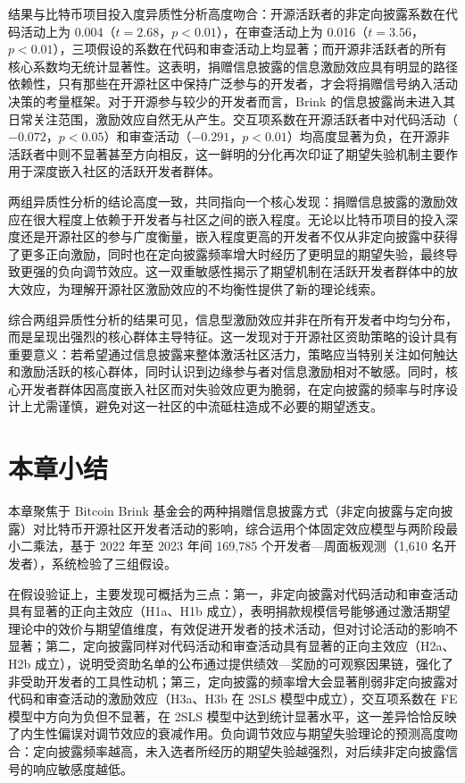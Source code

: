 \documentclass[
    type = master, %
    degree = professional,        %
    decl-page,  %
    twoside,                %
    fontset = fandol %
  ]{njuthesis}
\begin{document}
结果与比特币项目投入度异质性分析高度吻合：开源活跃者的非定向披露系数在代码活动上为 0.004（$t = 2.68$，$p < 0.01$），在审查活动上为 0.016（$t = 3.56$，$p < 0.01$），三项假设的系数在代码和审查活动上均显著；而开源非活跃者的所有核心系数均无统计显著性。这表明，捐赠信息披露的信息激励效应具有明显的路径依赖性，只有那些在开源社区中保持广泛参与的开发者，才会将捐赠信号纳入活动决策的考量框架。对于开源参与较少的开发者而言，Brink 的信息披露尚未进入其日常关注范围，激励效应自然无从产生。交互项系数在开源活跃者中对代码活动（$-0.072$，$p < 0.05$）和审查活动（$-0.291$，$p < 0.01$）均高度显著为负，在开源非活跃者中则不显著甚至方向相反，这一鲜明的分化再次印证了期望失验机制主要作用于深度嵌入社区的活跃开发者群体。

两组异质性分析的结论高度一致，共同指向一个核心发现：捐赠信息披露的激励效应在很大程度上依赖于开发者与社区之间的嵌入程度。无论以比特币项目的投入深度还是开源社区的参与广度衡量，嵌入程度更高的开发者不仅从非定向披露中获得了更多正向激励，同时也在定向披露频率增大时经历了更明显的期望失验，最终导致更强的负向调节效应。这一双重敏感性揭示了期望机制在活跃开发者群体中的放大效应，为理解开源社区激励效应的不均衡性提供了新的理论线索。

综合两组异质性分析的结果可见，信息型激励效应并非在所有开发者中均匀分布，而是呈现出强烈的核心群体主导特征。这一发现对于开源社区资助策略的设计具有重要意义：若希望通过信息披露来整体激活社区活力，策略应当特别关注如何触达和激励活跃的核心群体，同时认识到边缘参与者对信息激励相对不敏感。同时，核心开发者群体因高度嵌入社区而对失验效应更为脆弱，在定向披露的频率与时序设计上尤需谨慎，避免对这一社区的中流砥柱造成不必要的期望透支。

\section{本章小结}
\label{sec:summary-1}

本章聚焦于 Bitcoin Brink 基金会的两种捐赠信息披露方式（非定向披露与定向披露）对比特币开源社区开发者活动的影响，综合运用个体固定效应模型与两阶段最小二乘法，基于 2022 年至 2023 年间 169,785 个开发者—周面板观测（1,610 名开发者），系统检验了三组假设。

在假设验证上，主要发现可概括为三点：第一，非定向披露对代码活动和审查活动具有显著的正向主效应（H1a、H1b 成立），表明捐款规模信号能够通过激活期望理论中的效价与期望值维度，有效促进开发者的技术活动，但对讨论活动的影响不显著；第二，定向披露同样对代码活动和审查活动具有显著的正向主效应（H2a、H2b 成立），说明受资助名单的公布通过提供绩效—奖励的可观察因果链，强化了非受助开发者的工具性动机；第三，定向披露的频率增大会显著削弱非定向披露对代码和审查活动的激励效应（H3a、H3b 在 2SLS 模型中成立），交互项系数在 FE 模型中方向为负但不显著，在 2SLS 模型中达到统计显著水平，这一差异恰恰反映了内生性偏误对调节效应的衰减作用。负向调节效应与期望失验理论的预测高度吻合：定向披露频率越高，未入选者所经历的期望失验越强烈，对后续非定向披露信号的响应敏感度越低。
\end{document}
